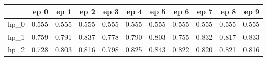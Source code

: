 \begin{tabular}{lrrrrrrrrrr}
\toprule
{} &   ep 0 &   ep 1 &   ep 2 &   ep 3 &   ep 4 &   ep 5 &   ep 6 &   ep 7 &   ep 8 &   ep 9 \\
\midrule
hp\_0 &  0.555 &  0.555 &  0.555 &  0.555 &  0.555 &  0.555 &  0.555 &  0.555 &  0.555 &  0.555 \\
hp\_1 &  0.759 &  0.791 &  0.837 &  0.778 &  0.790 &  0.803 &  0.755 &  0.832 &  0.817 &  0.833 \\
hp\_2 &  0.728 &  0.803 &  0.816 &  0.798 &  0.825 &  0.843 &  0.822 &  0.820 &  0.821 &  0.816 \\
\bottomrule
\end{tabular}
